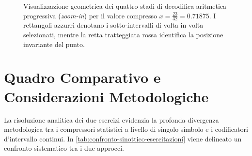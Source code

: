\begin{figure}[H]
\caption{Visualizzazione geometrica dei quattro stadi di decodifica aritmetica progressiva (\textit{zoom-in}) per il valore compresso $x = \frac{23}{32} = 0.71875$. I rettangoli azzurri denotano i sotto-intervalli di volta in volta selezionati, mentre la retta tratteggiata rossa identifica la posizione invariante del punto.}
\label{fig:zoom-in-aritmetico}
\end{figure}

\FloatBarrier
\section[Quadro Comparativo e Metodologico]{Quadro Comparativo e\\Considerazioni Metodologiche}
\label{sec:quadro-comparativo-esercitazioni}

La risoluzione analitica dei due esercizi evidenzia la profonda divergenza metodologica tra i compressori statistici a livello di singolo simbolo e i codificatori d'intervallo continui. In \autoref{tab:confronto-sinottico-esercitazioni} viene delineato un confronto sistematico tra i due approcci.

